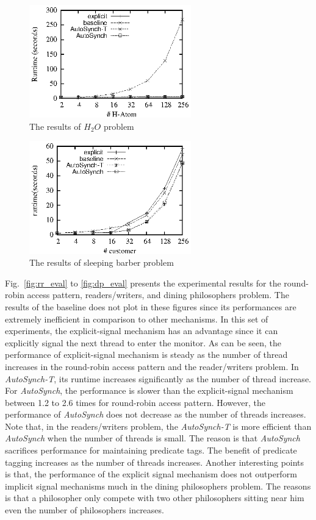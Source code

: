 \documentclass[preprint]{sigplanconf}
\begin{document}
\begin{figure}[ht!]
  \centering
  \includegraphics[width=70mm]{fig/h2o.eps}
  \caption{The results of $H_2O$ problem}
  \label{fig:h2o_eval}
\end{figure}

\begin{figure}[ht!]
  \centering
  \includegraphics[width=70mm]{fig/sb.eps}
  \caption{The results of sleeping barber problem}
  \label{fig:sb_eval}
\end{figure}



Fig.~\ref{fig:rr_eval} to \ref{fig:dp_eval} presents the experimental results for
the round-robin access pattern, readers/writers, %
and dining philosophers problem. The results of the
baseline does not plot in these figures since its performances are extremely
inefficient in comparison to other mechanisms.  In this set of experiments, 
the explicit-signal mechanism has an advantage since it can explicitly signal 
the next thread to enter the monitor. As can be seen, the performance of 
explicit-signal mechanism is steady as the number of thread increases in
the round-robin access pattern and the reader/writers problem. In 
{\em AutoSynch-T}, its runtime increases significantly as the 
number of thread increase. For {\em AutoSynch}, the performance is slower than 
the explicit-signal mechanism between 1.2 to 2.6 times for round-robin access
pattern. However, the performance of {\em AutoSynch} does not decrease as the 
number of threads increases. Note that, in the readers/writers problem, the
{\em AutoSynch-T} is more efficient than {\em AutoSynch} when the number of
threads is small. The reason is that {\em AutoSynch} sacrifices performance for
maintaining predicate tags. The benefit of predicate tagging increases as the
number of threads increases. Another interesting points is that, the
performance of the explicit signal mechanism does not outperform implicit
signal mechanisms much in the dining philosophers problem. The reasons is that
a philosopher only compete with two other philosophers sitting near him even
the number of philosophers increases. 
\end{document}
